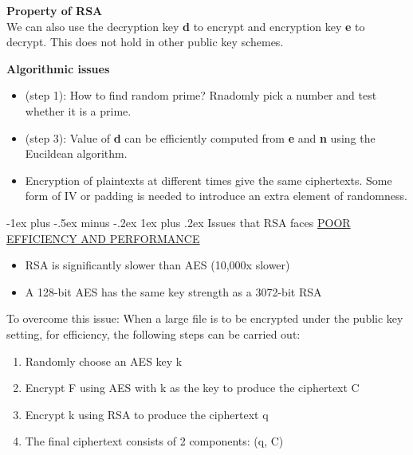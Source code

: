 \documentclass[10pt,landscape]{article}
\makeatletter
\renewcommand{\subsubsection}{\@startsection{subsubsection}{3}{0mm}%
                                {-1ex plus -.5ex minus -.2ex}%
                                {1ex plus .2ex}%
                                {\normalfont\small\bfseries}}
\makeatother
\begin{document}
\begin{multicols*}{3}
\textbf{Property of RSA} \\
We can also use the decryption key \textbf{d} to encrypt and encryption key \textbf{e} to decrypt.
This does not hold in other public key schemes. \newline

\textbf{Algorithmic issues}
\begin{itemize}[noitemsep,wide=0pt, leftmargin=\dimexpr{} + 2\relax]
    \item (step 1): How to find random prime? Rnadomly pick a number and test whether it is a prime.
    \item (step 3): Value of \textbf{d} can be efficiently computed from \textbf{e} and \textbf{n} using the Eucildean algorithm.
    \item Encryption of plaintexts at different times give the same ciphertexts. Some form of IV or padding is needed to introduce an extra element of randomness.
\end{itemize}

\subsubsection{Issues that RSA faces}
\underline{POOR EFFICIENCY AND PERFORMANCE}
\begin{itemize}[noitemsep,wide=0pt, leftmargin=\dimexpr{} + 2\relax]
    \item RSA is significantly slower than AES (10,000x slower)
    \item A 128-bit AES has the same key strength as a 3072-bit RSA
\end{itemize}

To overcome this issue: \newline
When a large file is to be encrypted under the public key setting, for efficiency, the
following steps can be carried out:
\begin{enumerate}[noitemsep,wide=0pt, leftmargin=\dimexpr\labelwidth + 2\labelsep\relax]
    \item Randomly choose an AES key k
    \item Encrypt F using AES with k as the key to produce the ciphertext C
    \item Encrypt k using RSA to produce the ciphertext q
    \item The final ciphertext consists of 2 components: (q, C) \newline
\end{enumerate} 


\end{multicols*}
\end{document}
